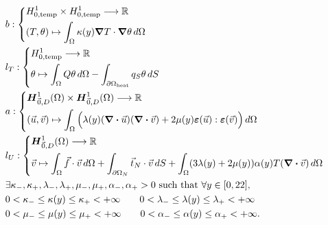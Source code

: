 \documentclass[a4paper,12pt,twoside]{report}
\newcommand{\mtr}{\mathbb{R}}
\begin{document}
\begin{equation*}
	\begin{aligned}
	& b : \left\{
		\begin{aligned}
			& H^1_{0,\text{temp}} \times H^1_{0,\text{temp}} \longrightarrow \mtr \\
			& (T, \theta) \mapsto \int_{\Omega} \kappa(y) \grad T \cdot \grad \theta \, d\Omega 
		\end{aligned}
	\right. \\
	& l_T : \left\{
		\begin{aligned}
			& H^1_{0,\text{temp}} \longrightarrow \mtr \\
			& \theta \mapsto\int_{\Omega} Q \theta \, d\Omega - \int_{\partial\Omega_{\text{heat}}} q_S \theta \, dS
		\end{aligned}
	\right. \\
	& a : \left\{
		\begin{aligned}
			& \boldsymbol{H}^1_{\vec 0,D}(\Omega) \times \boldsymbol{H}^1_{\vec 0,D}(\Omega) \longrightarrow \mtr \\
			& (\vec u, \vec v) \mapsto \int_{\Omega} \Big( \lambda(y) (\div \vec u) (\div \vec v) + 2\mu(y) \boldsymbol{\varepsilon}(\vec u) : \boldsymbol{\varepsilon}(\vec v) \Big) \, d\Omega 
		\end{aligned}
	\right. \\
	& l_U : \left\{
		\begin{aligned}
			& \boldsymbol{H}^1_{\vec 0,D}(\Omega) \longrightarrow \mtr \\ 
			& \vec v \mapsto \int_{\Omega} \vec f \cdot \vec v \, d\Omega + \int_{\partial\Omega_N} \vec t_N \cdot \vec v \, dS + \int_{\Omega} (3\lambda(y) + 2\mu(y)) \alpha(y) T (\div \vec v) \, d\Omega
		\end{aligned}
	\right.\\
	& \exists \kappa_-, \kappa_+, \lambda_-, \lambda_+, \mu_-, \mu_+, \alpha_-, \alpha_+ > 0 \text{ such that } \forall y \in [0,22], \\
	& 0 < \kappa_- \leq \kappa(y) \leq \kappa_+ < + \infty \qquad 0 < \lambda_- \leq \lambda(y) \leq \lambda_+ < + \infty \\
	& 0 < \mu_- \leq \mu(y) \leq \mu_+ < + \infty \qquad 0 < \alpha_- \leq \alpha(y) \leq \alpha_+ < + \infty.
	\end{aligned}
\end{equation*}
\end{document}
